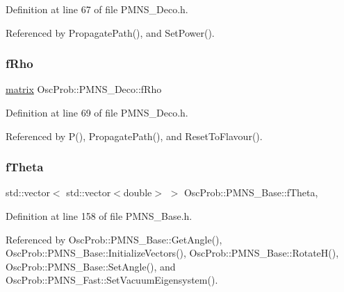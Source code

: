 Definition at line 67 of file P\+M\+N\+S\+\_\+\+Deco.\+h.



Referenced by Propagate\+Path(), and Set\+Power().

\mbox{\label{classOscProb_1_1PMNS__Deco_a0488d62b4ef4cf5b43425769f5fcdbdf}} 
\subsubsection{\texorpdfstring{f\+Rho}{fRho}}
{\footnotesize\ttfamily \hyperlink{classOscProb_1_1PMNS__Deco_a77b4e0c041b6268910a270be0f5387c9}{matrix} Osc\+Prob\+::\+P\+M\+N\+S\+\_\+\+Deco\+::f\+Rho\hspace{0.3cm}{\ttfamily [protected]}}



Definition at line 69 of file P\+M\+N\+S\+\_\+\+Deco.\+h.



Referenced by P(), Propagate\+Path(), and Reset\+To\+Flavour().

\mbox{\label{classOscProb_1_1PMNS__Base_a1976887cd658dd86b2336c181f1470b4}} 
\subsubsection{\texorpdfstring{f\+Theta}{fTheta}}
{\footnotesize\ttfamily std\+::vector$<$ std\+::vector$<$double$>$ $>$ Osc\+Prob\+::\+P\+M\+N\+S\+\_\+\+Base\+::f\+Theta\hspace{0.3cm}{\ttfamily [protected]}, {\ttfamily [inherited]}}



Definition at line 158 of file P\+M\+N\+S\+\_\+\+Base.\+h.



Referenced by Osc\+Prob\+::\+P\+M\+N\+S\+\_\+\+Base\+::\+Get\+Angle(), Osc\+Prob\+::\+P\+M\+N\+S\+\_\+\+Base\+::\+Initialize\+Vectors(), Osc\+Prob\+::\+P\+M\+N\+S\+\_\+\+Base\+::\+Rotate\+H(), Osc\+Prob\+::\+P\+M\+N\+S\+\_\+\+Base\+::\+Set\+Angle(), and Osc\+Prob\+::\+P\+M\+N\+S\+\_\+\+Fast\+::\+Set\+Vacuum\+Eigensystem().

